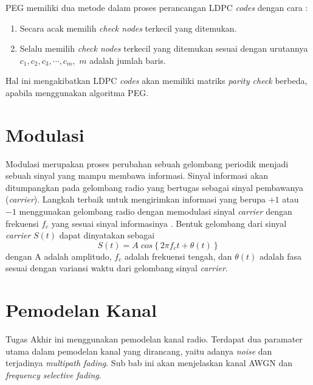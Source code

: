 PEG memiliki dua metode dalam proses perancangan LDPC \textit{codes} dengan cara \cite{PEG2}:
\begin{enumerate}
	\item Secara acak memilih \textit{check nodes} terkecil yang ditemukan.
	\item Selalu memilih \textit{check nodes} terkecil yang ditemukan sesuai dengan urutannya $c_1, c_2, c_3, \cdots, c_{m},$ $m$ adalah jumlah baris.
\end{enumerate}
Hal ini mengakibatkan LDPC \textit{codes} akan memiliki matriks \textit{parity check} berbeda, apabila menggunakan algoritma PEG.


\section{Modulasi}
Modulasi merupakan proses perubahan sebuah gelombang periodik menjadi sebuah sinyal yang mampu membawa informasi. Sinyal informasi akan ditumpangkan pada gelombang radio yang bertugas sebagai sinyal pembawanya (\textit{carrier}). Langkah terbaik untuk mengirimkan informasi yang berupa $+1$ atau $-1$ menggunakan gelombang radio dengan memodulasi sinyal \textit{carrier} dengan frekuensi $f_c$ yang sesuai sinyal informasinya \cite{modul}. Bentuk gelombang dari sinyal \textit{carrier} $S(t)$ dapat dinyatakan sebagai 
\begin{equation}
	S(t) =A \; cos \left \{ 2\pi f_c t + \theta \left( t \right ) \right \}
\end{equation}
dengan A adalah amplitudo, $f_c$ adalah frekuensi tengah, dan $\theta (t)$ adalah fasa sesuai dengan variansi waktu dari gelombang sinyal \textit{carrier}. 



\section{Pemodelan Kanal}
Tugas Akhir ini menggunakan pemodelan kanal radio. Terdapat dua paramater utama dalam pemodelan kanal yang dirancang, yaitu adanya \textit{noise} dan terjadinya \textit{multipath fading}. Sub bab ini akan menjelaskan kanal AWGN dan \textit{frequency selective fading}.
